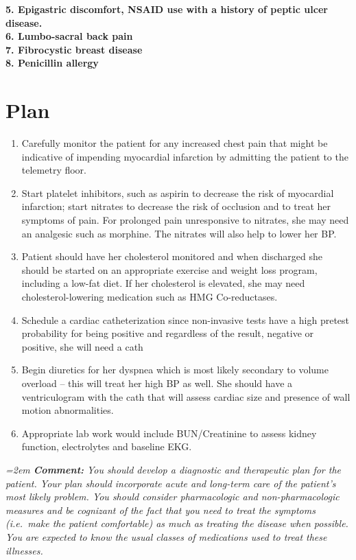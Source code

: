 \documentclass[11pt]{article}
\newcommand{\cm}[1]{%
  \par\nopagebreak\vspace{-0.2em}%
  \begingroup\small\itshape\color{cmtcolor}%
  \hangindent=2em \hangafter=0 \hspace*{1.2em}\textbf{Comment:} #1\par%
  \endgroup}
\begin{document}
\textbf{5. Epigastric discomfort, NSAID use with a history of peptic ulcer disease.}\\
\textbf{6. Lumbo-sacral back pain}\\
\textbf{7. Fibrocystic breast disease}\\
\textbf{8. Penicillin allergy}

\section*{Plan}

\begin{enumerate}[leftmargin=2em,label=\arabic*.,itemsep=0.4em,topsep=0pt,parsep=0pt]
  \item Carefully monitor the patient for any increased chest pain that might be indicative of impending myocardial infarction by admitting the patient to the telemetry floor.
  \item Start platelet inhibitors, such as aspirin to decrease the risk of myocardial infarction; start nitrates to decrease the risk of occlusion and to treat her symptoms of pain. For prolonged pain unresponsive to nitrates, she may need an analgesic such as morphine. The nitrates will also help to lower her BP.
  \item Patient should have her cholesterol monitored and when discharged she should be started on an appropriate exercise and weight loss program, including a low-fat diet. If her cholesterol is elevated, she may need cholesterol-lowering medication such as HMG Co-reductases.
  \item Schedule a cardiac catheterization since non-invasive tests have a high pretest probability for being positive and regardless of the result, negative or positive, she will need a cath
  \item Begin diuretics for her dyspnea which is most likely secondary to volume overload -- this will treat her high BP as well. She should have a ventriculogram with the cath that will assess cardiac size and presence of wall motion abnormalities.
  \item Appropriate lab work would include BUN/Creatinine to assess kidney function, electrolytes and baseline EKG.
\end{enumerate}
\cm{You should develop a diagnostic and therapeutic plan for the patient. Your plan should incorporate acute and long-term care of the patient's most likely problem. You should consider pharmacologic and non-pharmacologic measures and be cognizant of the fact that you need to treat the symptoms (i.e.\ make the patient comfortable) as much as treating the disease when possible. You are expected to know the usual classes of medications used to treat these illnesses.}
\end{document}
